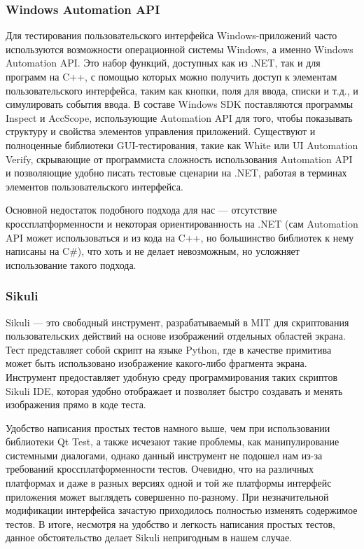 ﻿\documentclass[conference]{IEEEtran}
\begin{document}
\subsubsection{Windows Automation API}
Для тестирования пользовательского интерфейса Windows-приложений часто используются 
возможности операционной системы Windows, а именно Windows Automation API. Это набор 
функций, доступных как из .NET, так и для программ на C++, с помощью которых можно 
получить доступ к элементам пользовательского интерфейса, таким как кнопки, поля для 
ввода, списки и т.д., и симулировать события ввода. В составе Windows SDK поставляются 
программы Inspect и AccScope, использующие Automation API для того, чтобы показывать 
структуру и свойства элементов управления приложений. Существуют и полноценные библиотеки 
GUI-тестирования, такие как White или UI Automation Verify, скрывающие от программиста 
сложность использования Automation API и позволяющие удобно писать тестовые сценарии на 
.NET, работая в терминах элементов пользовательского интерфейса.

Основной недостаток подобного подхода для нас --- отсутствие кроссплатформенности 
и некоторая ориентированность на .NET (сам Automation API может использоваться и из 
кода на C++, но большинство библиотек к нему написаны на C\#), что хоть и не делает 
невозможным, но усложняет использование такого подхода.

\subsubsection{Sikuli}
Sikuli --- это свободный инструмент, разрабатываемый в MIT для скриптования пользовательских 
действий на основе изображений отдельных областей экрана. Тест представляет собой 
скрипт на языке Python, где в качестве примитива может быть использовано изображение 
какого-либо фрагмента экрана. Инструмент предоставляет удобную среду программирования 
таких скриптов Sikuli IDE, которая удобно отображает и позволяет быстро создавать 
и менять изображения прямо в коде теста.

Удобство написания простых тестов намного выше, чем при использовании библиотеки Qt Test, 
а также исчезают такие проблемы, как манипулирование системными диалогами, однако 
данный инструмент не подошел нам из-за требований кроссплатформенности тестов. Очевидно, 
что на различных платформах и даже в разных версиях одной и той же платформы интерфейс 
приложения может выглядеть совершенно по-разному. При незначительной модификации интерфейса 
зачастую приходилось полностью изменять содержимое тестов. В итоге, несмотря на удобство 
и легкость написания простых тестов, данное обстоятельство делает Sikuli непригодным в нашем случае.
\end{document}
